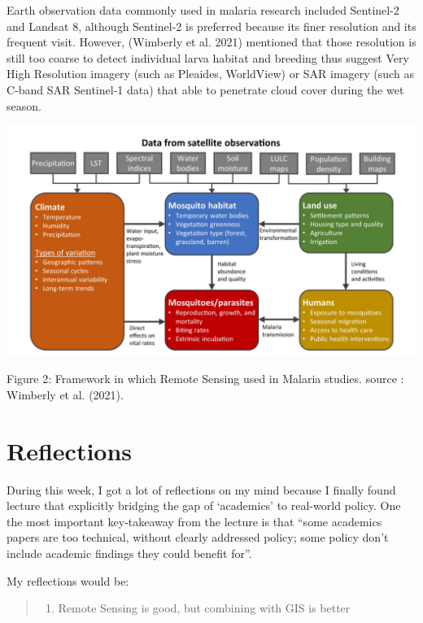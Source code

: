 \documentclass[
  letterpaper,
  DIV=11,
  numbers=noendperiod]{scrreprt}
\providecommand{\tightlist}{%
  \setlength{\itemsep}{0pt}\setlength{\parskip}{0pt}}\usepackage{longtable,booktabs,array}
\begin{document}
Earth observation data commonly used in malaria research included
Sentinel-2 and Landsat 8, although Sentinel-2 is preferred because its
finer resolution and its frequent visit. However, (Wimberly et al. 2021)
mentioned that those resolution is still too coarse to detect individual
larva habitat and breeding thus suggest Very High Resolution imagery
(such as Pleaides, WorldView) or SAR imagery (such as C-band SAR
Sentinel-1 data) that able to penetrate cloud cover during the wet
season.

\includegraphics{images/clipboard-687725868.png}

Figure 2: Framework in which Remote Sensing used in Malaria studies.
source : Wimberly et al. (2021).

\hypertarget{reflections-2}{%
\section{Reflections}\label{reflections-2}}

During this week, I got a lot of reflections on my mind because I
finally found lecture that explicitly bridging the gap of `academics' to
real-world policy. One the most important key-takeaway from the lecture
is that ``some academics papers are too technical, without clearly
addressed policy; some policy don't include academic findings they could
benefit for''.

My reflections would be:

\begin{quote}
\begin{enumerate}
\def\labelenumi{\arabic{enumi}.}
\tightlist
\item
  Remote Sensing is good, but combining with GIS is better
\end{enumerate}
\end{quote}
\end{document}
